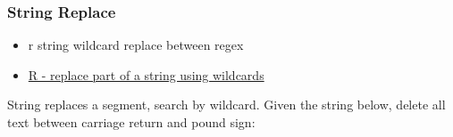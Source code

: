 \documentclass[
]{book}
\newenvironment{Shaded}{\begin{snugshade}}{\end{snugshade}}
\newcommand{\AttributeTok}[1]{\textcolor[rgb]{0.77,0.63,0.00}{#1}}
\newcommand{\CommentTok}[1]{\textcolor[rgb]{0.56,0.35,0.01}{\textit{#1}}}
\newcommand{\FunctionTok}[1]{\textcolor[rgb]{0.00,0.00,0.00}{#1}}
\newcommand{\NormalTok}[1]{#1}
\newcommand{\SpecialCharTok}[1]{\textcolor[rgb]{0.00,0.00,0.00}{#1}}
\newcommand{\StringTok}[1]{\textcolor[rgb]{0.31,0.60,0.02}{#1}}
\providecommand{\tightlist}{%
  \setlength{\itemsep}{0pt}\setlength{\parskip}{0pt}}
\begin{document}
\hypertarget{string-replace}{%
\subsubsection{String Replace}\label{string-replace}}

\begin{itemize}
\tightlist
\item
  r string wildcard replace between regex
\item
  \href{https://stackoverflow.com/a/27246520/8280804}{R - replace part of a string using wildcards}
\end{itemize}

\begin{Shaded}
\end{Shaded}

String replaces a segment, search by wildcard. Given the string below, delete all text between carriage return and pound sign:
\end{document}
